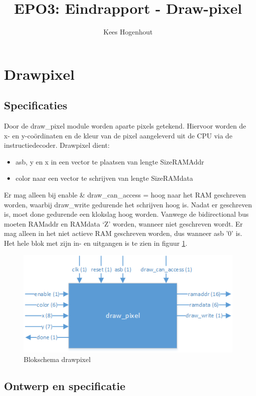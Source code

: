 \documentclass{scrartcl} %
\author{Kees Hogenhout}%
\title{EPO3: Eindrapport - Draw-pixel}
\begin{document}
\section{Drawpixel} %
\label{sec:drawpixel} %

\subsection{Specificaties}
\label{ssec:specs_dp}
Door de draw\_pixel module worden aparte pixels getekend. Hiervoor worden de x- en y-coördinaten en de kleur van de pixel aangeleverd uit de CPU via de instructiedecoder.  Drawpixel dient: 
\begin{itemize}
\item asb, y en x in een vector te plaatsen van lengte SizeRAMAddr
\item color naar een vector te schrijven van lengte SizeRAMdata
\end{itemize}
  Er mag alleen bij enable \& draw\_can\_access = hoog naar het RAM geschreven worden, waarbij draw\_write gedurende het schrijven hoog is.  Nadat er geschreven is, moet done gedurende een klokslag hoog worden. Vanwege de bidirectional bus moeten RAMaddr en RAMdata `Z' worden, wanneer niet geschreven wordt. Er mag alleen in het niet actieve RAM geschreven worden, dus wanneer asb '0' is. Het hele blok met zijn in- en uitgangen is te zien in figuur  \ref{fig:dp_blokschema}. 
\begin{figure} [h!]
\centering
\includegraphics [width = \textwidth] {resource/dp_blokschema-rc}
\caption{Blokschema drawpixel}
\label{fig:dp_blokschema}
\end{figure}

\subsection{Ontwerp en specificatie}
\label{ssec:vhdl_dp}
\end{document}
